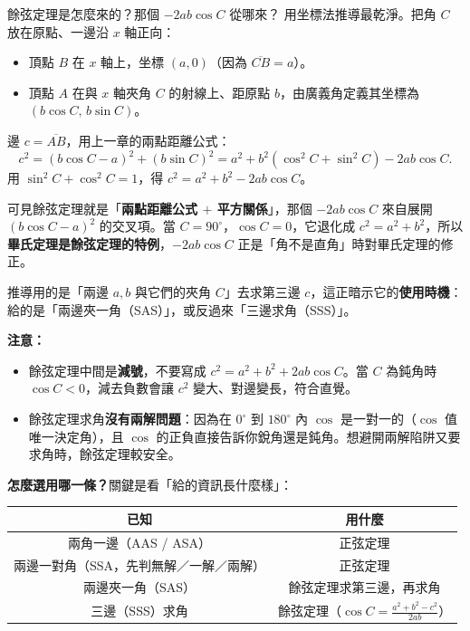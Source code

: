 \documentclass[11pt]{article}
\begin{document}
\begin{補充框}{餘弦定理是怎麼來的？那個 $-2ab\cos C$ 從哪來？}
用坐標法推導最乾淨。把角 $C$ 放在原點、一邊沿 $x$ 軸正向：
\begin{itemize}\setlength{\itemsep}{1pt}
\item 頂點 $B$ 在 $x$ 軸上，坐標 $(a,0)$（因為 $\overline{CB}=a$）。
\item 頂點 $A$ 在與 $x$ 軸夾角 $C$ 的射線上、距原點 $b$，由廣義角定義其坐標為 $(b\cos C,\,b\sin C)$。
\end{itemize}
邊 $c=\overline{AB}$，用上一章的兩點距離公式：
$$c^2=(b\cos C-a)^2+(b\sin C)^2=a^2+b^2(\cos^2C+\sin^2C)-2ab\cos C.$$
用 $\sin^2C+\cos^2C=1$，得 $c^2=a^2+b^2-2ab\cos C$。

可見餘弦定理就是「\textbf{兩點距離公式 $+$ 平方關係}」，那個 $-2ab\cos C$ 來自展開 $(b\cos C-a)^2$ 的交叉項。當 $C=90^\circ$，$\cos C=0$，它退化成 $c^2=a^2+b^2$，所以\textbf{畢氏定理是餘弦定理的特例}，$-2ab\cos C$ 正是「角不是直角」時對畢氏定理的修正。

推導用的是「兩邊 $a,b$ 與它們的夾角 $C$」去求第三邊 $c$，這正暗示它的\textbf{使用時機}：給的是「兩邊夾一角（SAS）」，或反過來「三邊求角（SSS）」。

\textbf{注意：}
\begin{itemize}\setlength{\itemsep}{1pt}
\item 餘弦定理中間是\textbf{減號}，不要寫成 $c^2=a^2+b^2+2ab\cos C$。當 $C$ 為鈍角時 $\cos C<0$，減去負數會讓 $c^2$ 變大、對邊變長，符合直覺。
\item 餘弦定理求角\textbf{沒有兩解問題}：因為在 $0^\circ$ 到 $180^\circ$ 內 $\cos$ 是一對一的（$\cos$ 值唯一決定角），且 $\cos$ 的正負直接告訴你銳角還是鈍角。想避開兩解陷阱又要求角時，餘弦定理較安全。
\end{itemize}
\end{補充框}

\textbf{怎麼選用哪一條？}關鍵是看「給的資訊長什麼樣」：

\begin{center}
\renewcommand{\arraystretch}{1.4}
\begin{tabular}{c|c}
\hline
已知 & 用什麼 \\
\hline
兩角一邊（AAS / ASA） & 正弦定理 \\
兩邊一對角（SSA，先判無解／一解／兩解） & 正弦定理 \\
兩邊夾一角（SAS） & 餘弦定理求第三邊，再求角 \\
三邊（SSS）求角 & 餘弦定理（$\cos C=\frac{a^2+b^2-c^2}{2ab}$） \\
\hline
\end{tabular}
\end{center}
\end{document}
